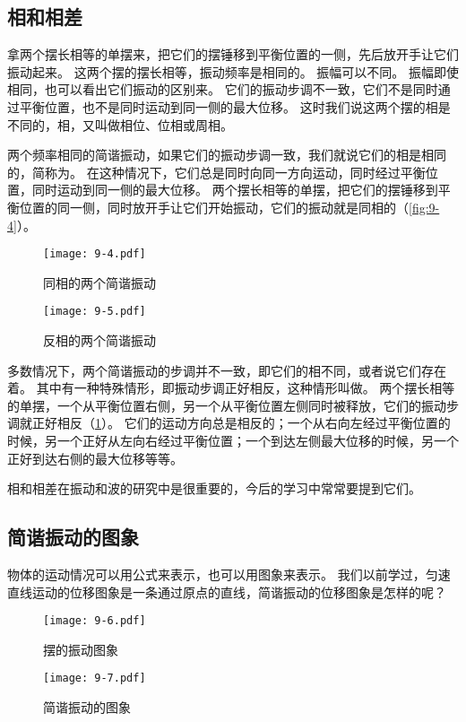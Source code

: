 \subsection{相和相差}
拿两个摆长相等的单摆来，把它们的摆锤移到平衡位置的一侧，先后放开手让它们振动起来。
这两个摆的摆长相等，振动频率是相同的。
振幅可以不同。
振幅即使相同，也可以看出它们振动的区别来。
它们的振动步调不一致，它们不是同时通过平衡位置，也不是同时运动到同一侧的最大位移。
这时我们说这两个摆的相是不同的，相，又叫做相位、位相或周相。

两个频率相同的简谐振动，如果它们的振动步调一致，我们就说它们的相是相同的，简称为。
在这种情况下，它们总是同时向同一方向运动，同时经过平衡位置，同时运动到同一侧的最大位移。
两个摆长相等的单摆，把它们的摆锤移到平衡位置的同一侧，同时放开手让它们开始振动，它们的振动就是同相的（\cref{fig:9-4}）。
\begin{figure}
  \begin{minipage}{0.45\linewidth}\centering
    \texttt{[image: 9-4.pdf]}
    \caption{同相的两个简谐振动}\label{fig:9-4}
  \end{minipage}\hfill
  \begin{minipage}{0.5\linewidth}\centering
    \texttt{[image: 9-5.pdf]}
    \caption{反相的两个简谐振动}\label{fig:9-5}
  \end{minipage}%
\end{figure}

多数情况下，两个简谐振动的步调并不一致，即它们的相不同，或者说它们存在着。
其中有一种特殊情形，即振动步调正好相反，这种情形叫做。
两个摆长相等的单摆，一个从平衡位置右侧，另一个从平衡位置左侧同时被释放，它们的振动步调就正好相反（\cref{fig:9-5}）。
它们的运动方向总是相反的；一个从右向左经过平衡位置的时候，另一个正好从左向右经过平衡位置；一个到达左侧最大位移的时候，另一个正好到达右侧的最大位移等等。

相和相差在振动和波的研究中是很重要的，今后的学习中常常要提到它们。

\subsection{简谐振动的图象}
物体的运动情况可以用公式来表示，也可以用图象来表示。
我们以前学过，匀速直线运动的位移图象是一条通过原点的直线，简谐振动的位移图象是怎样的呢？
\begin{figure}
  \begin{minipage}[b]{0.45\linewidth}\centering
    \texttt{[image: 9-6.pdf]}
    \caption{摆的振动图象}\label{fig:9-6}
  \end{minipage}%
  \begin{minipage}[b]{0.55\linewidth}\centering
    \texttt{[image: 9-7.pdf]}
    \caption{简谐振动的图象}\label{fig:9-7}
  \end{minipage}
\end{figure}

